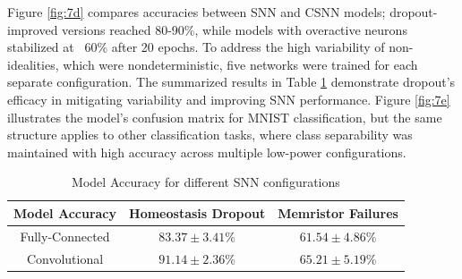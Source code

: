 \noindent Figure \ref{fig:7d} compares accuracies between SNN and CSNN models; dropout-improved versions reached 80-90\%, while models with overactive neurons stabilized at ~60\% after 20 epochs. To address the high variability of non-idealities, which were nondeterministic, five networks were trained for each separate configuration. The summarized results in Table \ref{table:7a} demonstrate dropout's efficacy in mitigating variability and improving SNN performance. Figure \ref{fig:7e} illustrates the model's confusion matrix for MNIST classification, but the same structure applies to other classification tasks, where class separability was maintained with high accuracy across multiple low-power configurations.\\

\begin{table}[!t]
    \caption{Model Accuracy for different SNN configurations}
    \begin{center}
    \begin{tabular}{|c|c|c|}
    \hline
    Model Accuracy  & Homeostasis Dropout & Memristor Failures \\ \hline
    Fully-Connected & $83.37 \pm 3.41 \%$  & $61.54 \pm 4.86 \%$ \\ \hline
    Convolutional   & $91.14 \pm 2.36 \%$  & $65.21 \pm 5.19 \%$  \\ \hline
    \end{tabular}
    \label{table:7a}
    \end{center}
    \vspace*{-\baselineskip}
\end{table}



